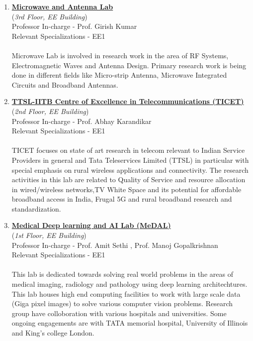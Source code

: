 \documentclass[openany]{book} %
\begin{document}
\begin{enumerate}
\item \href{https://www.ee.iitb.ac.in/~mwave/} {\color{blue} \textbf{Microwave and Antenna Lab}}\\
    (\textit{3rd Floor, EE Building})\\
    Professor In-charge - Prof. Girish Kumar\\
Relevant Specializations - EE1\\
\\
Microwave Lab is involved in research work in the area of RF Systems, Electromagnetic Waves and Antenna Design. Primary research work is being done in different fields like Micro-strip Antenna, Microwave Integrated Circuits and Broadband Antennas.\\

\item \href{https://www.ee.iitb.ac.in/web/research/labs/ticet} {\color{blue} \textbf{TTSL-IITB Centre of Excellence in Telecommunications (TICET)}}\\
    (\textit{2nd Floor, EE Building})\\
    Professor In-charge - Prof. Abhay Karandikar\\
Relevant Specializations - EE1\\
\\
TICET focuses on state of art research in telecom relevant to Indian Service Providers in general and Tata Teleservices Limited (TTSL) in particular with special emphasis on rural wireless applications and connectivity. The research activities in this lab are related to Quality of Service and resource allocation in wired/wireless networks,TV White Space and its potential for affordable broadband access in India, Frugal 5G and rural broadband research and standardization.\\

\item \href{https://www.ee.iitb.ac.in/~asethi/research.html} {\color{blue} \textbf{Medical Deep learning and AI Lab (MeDAL)}}\\
    (\textit{1st Floor, EE Building})\\
    Professor In-charge - Prof. Amit Sethi , Prof. Manoj Gopalkrishnan\\
Relevant Specializations - EE1\\
\\
This lab is dedicated towards solving real world problems in the areas of medical imaging, radiology and pathology using deep learning architechtures. This lab houses high end computing facilities to work with large scale data (Giga pixel images) to solve various computer vision problems. Research group have colloboration with various hospitals and universities. Some ongoing engagements are with TATA memorial hospital, University of Illinois and King's college London.\\


\end{enumerate}
\end{document}
